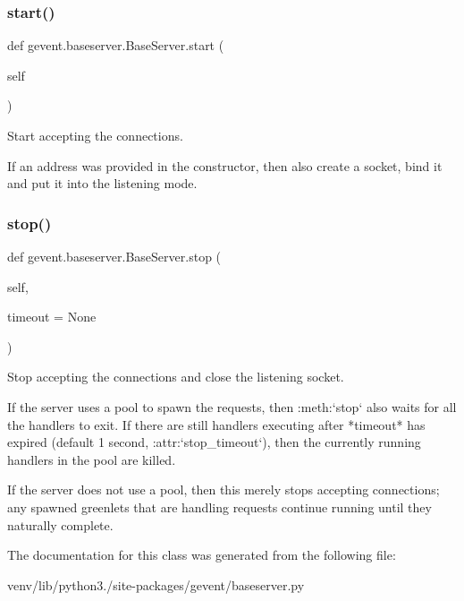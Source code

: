 \subsubsection{\texorpdfstring{start()}{start()}}
{\footnotesize\ttfamily def gevent.\+baseserver.\+Base\+Server.\+start (\begin{DoxyParamCaption}\item[{}]{self }\end{DoxyParamCaption})}

\begin{DoxyVerb}Start accepting the connections.

If an address was provided in the constructor, then also create a socket,
bind it and put it into the listening mode.
\end{DoxyVerb}
 \mbox{\label{classgevent_1_1baseserver_1_1_base_server_a64f2dbb3a0741c2a8b7e2396175567fa}} 
\subsubsection{\texorpdfstring{stop()}{stop()}}
{\footnotesize\ttfamily def gevent.\+baseserver.\+Base\+Server.\+stop (\begin{DoxyParamCaption}\item[{}]{self,  }\item[{}]{timeout = {\ttfamily None} }\end{DoxyParamCaption})}

\begin{DoxyVerb}Stop accepting the connections and close the listening socket.

If the server uses a pool to spawn the requests, then
:meth:`stop` also waits for all the handlers to exit. If there
are still handlers executing after *timeout* has expired
(default 1 second, :attr:`stop_timeout`), then the currently
running handlers in the pool are killed.

If the server does not use a pool, then this merely stops accepting connections;
any spawned greenlets that are handling requests continue running until
they naturally complete.
\end{DoxyVerb}
 

The documentation for this class was generated from the following file\+:\begin{DoxyCompactItemize}
\item 
venv/lib/python3./site-\/packages/gevent/baseserver.\+py\end{DoxyCompactItemize}
